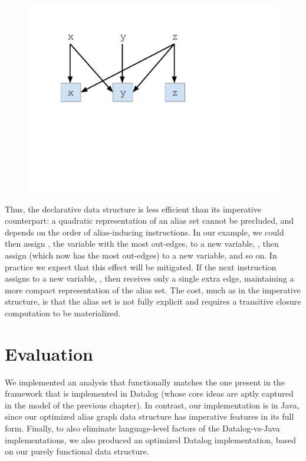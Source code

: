 \begin{figure}[ht]
\centering
\includegraphics[trim={25mm 85mm 70mm 25mm},clip,width=0.6\linewidth]{assets/must-data/decl-alias-graph2.pdf}
\end{figure}

Thus, the declarative data structure is less efficient than its imperative counterpart: a quadratic representation of an alias set cannot be precluded, and depends on the order of alias-inducing instructions. In our example, we could then assign , the variable with the most out-edges, to a new variable, , then assign  (which now has the most out-edges) to a new variable, and so on. In practice we expect that this effect will be mitigated. If the next instruction assigns  to a new variable, , then  receives only a single extra edge, maintaining a more compact representation of the alias set. The cost, much as in the imperative structure, is that the alias set is not fully explicit and requires a transitive closure computation to be materialized.


\section{Evaluation}

We implemented an analysis that functionally matches the one present in the \doop{} framework that is implemented in Datalog (whose core ideas are aptly captured in the model of the previous chapter). In contrast, our implementation is in Java, since our optimized alias graph data structure has imperative features in its full form. Finally, to also eliminate language-level factors of the Datalog-vs-Java implementations, we also produced an optimized Datalog implementation, based on our purely functional data structure.

